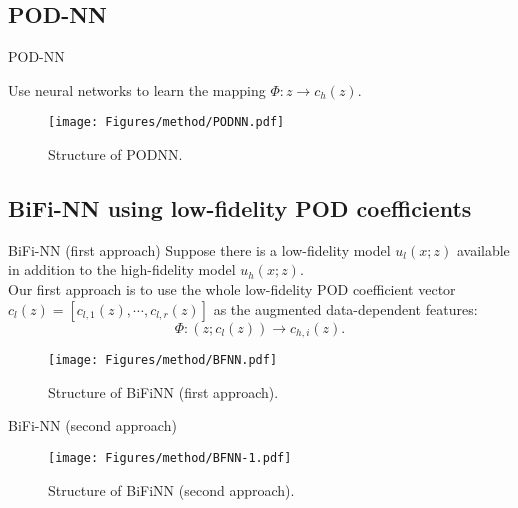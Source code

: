 \documentclass[10pt]{beamer}
\begin{document}
\subsection{POD-NN}

\begin{frame}{POD-NN}

Use neural networks to learn the mapping $\Phi: z \to c_h(z) $.

\begin{figure}
\centering
\texttt{[image: Figures/method/PODNN.pdf]}
\caption{Structure of PODNN.}
\label{PODNN-structure}
\end{figure}
\end{frame}


\subsection{BiFi-NN using low-fidelity POD coefficients}

\begin{frame}{BiFi-NN (first approach)}
Suppose there is a low-fidelity model $u_l(x; z) $ available in addition to the high-fidelity model $u_h(x; z) $. \\[10pt]

Our first approach is to use the whole low-fidelity POD coefficient vector $c_l(z) = [c_{l,1}(z), \cdots, c_{l, r}(z)]$ as the augmented data-dependent features: \\[10pt]
\begin{equation}
\Phi: (z; c_l(z)) \to  c_{h,i}(z).
\end{equation}
\begin{figure}
\centering
\texttt{[image: Figures/method/BFNN.pdf]}
\caption{Structure of BiFiNN (first approach).}
\label{BiFiNN-structure}
\end{figure}
\end{frame}

\begin{frame}{BiFi-NN (second approach)}
\begin{figure}
\centering
\texttt{[image: Figures/method/BFNN-1.pdf]}
\caption{Structure of BiFiNN (second approach).}
\label{BiFiNN-structure}
\end{figure}
\end{frame}
\end{document}
